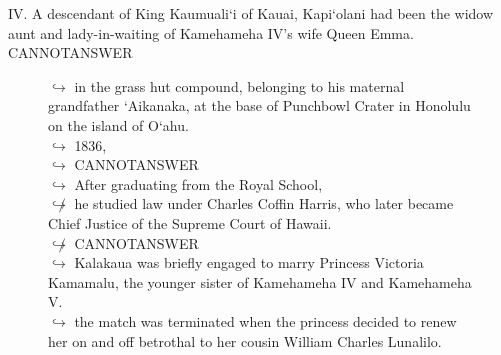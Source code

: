 \documentclass[11pt,a4paper, onecolumn]{article}
\begin{document}
IV. A descendant of King Kaumuali`i of Kauai, Kapi`olani had been the widow aunt and lady-in-waiting of Kamehameha IV's wife Queen Emma. CANNOTANSWER

\begin{figure}[t] \small \begin{tcolorbox}[boxsep=0pt,left=5pt,right=0pt,top=2pt,colback = yellow!5] \begin{dialogue}
 \small 
\colorbox{pink!25}{$\hookrightarrow$}
{ in the grass hut compound, belonging to his maternal grandfather `Aikanaka, at the base of Punchbowl Crater in Honolulu on the island of O`ahu. }
\\
\colorbox{pink!25}{$\hookrightarrow$}
{ 1836, }
\\
\colorbox{pink!25}{$\hookrightarrow$}
{ CANNOTANSWER }
\\
\colorbox{pink!25}{$\hookrightarrow$}
{ After graduating from the Royal School, }
\\
\colorbox{pink!25}{$\not\hookrightarrow$}
{ he studied law under Charles Coffin Harris, who later became Chief Justice of the Supreme Court of Hawaii. }
\\
\colorbox{pink!25}{$\not\hookrightarrow$}
{ CANNOTANSWER }
\\
\colorbox{pink!25}{$\hookrightarrow$}
{ Kalakaua was briefly engaged to marry Princess Victoria Kamamalu, the younger sister of Kamehameha IV and Kamehameha V. }
\\
\colorbox{pink!25}{$\hookrightarrow$}
{ the match was terminated when the princess decided to renew her on and off betrothal to her cousin William Charles Lunalilo. }
 \end{dialogue}\end{tcolorbox}\end{figure}
\end{document}
